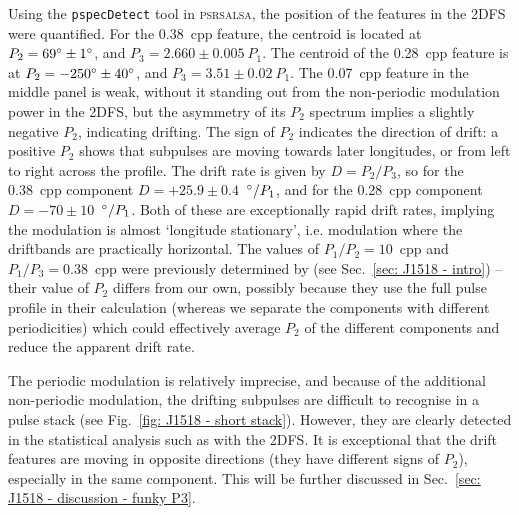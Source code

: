 Using the \texttt{pspecDetect} tool in \textsc{psrsalsa}, the position of the features in the 2DFS were quantified. For the 0.38~cpp feature, the centroid is located at $P_2 = 69^\circ \pm 1 ^\circ$, and $P_3 = 2.660 \pm 0.005\ P_1$. The centroid of the 0.28~cpp feature is at $P_2 = -250^\circ \pm 40 ^\circ$, and $P_3 = 3.51 \pm0.02\ P_1$. The 0.07~cpp feature in the middle panel is weak, without it standing out from the non-periodic modulation power in the 2DFS, but the asymmetry of its $P_2$ spectrum implies a slightly negative $P_2$, indicating drifting. The sign of $P_2$ indicates the direction of drift: a positive $P_2$ shows that subpulses are moving towards later longitudes, or from left to right across the profile. The drift rate is given by $D=P_2 / P_3$, so for the 0.38~cpp component $D=+25.9\pm0.4$~$^\circ/P_1$, and for the 0.28~cpp component $D = -70 \pm 10$~$^\circ/P_1$. Both of these are exceptionally rapid drift rates, implying the modulation is almost `longitude stationary', i.e. modulation where the driftbands are practically horizontal. The values of $P_1/P_2 = 10$~cpp and $P_1/P_3 = 0.38$~cpp were previously determined by \citet{ESxx2003} (see Sec.~\ref{sec: J1518 - intro}) -- their value of $P_2$ differs from our own, possibly because they use the full pulse profile in their calculation (whereas we separate the components with different periodicities) which could effectively average $P_2$ of the different components and reduce the apparent drift rate. 

The periodic modulation is relatively imprecise, and because of the additional non-periodic modulation, the drifting subpulses are difficult to recognise in a pulse stack (see Fig.~\ref{fig: J1518 - short stack}). However, they are clearly detected in the statistical analysis such as with the 2DFS. It is exceptional that the  drift features are moving in opposite directions (they have different signs of $P_2$), especially in the same component. This will be further discussed in Sec.~\ref{sec: J1518 - discussion - funky P3}.















